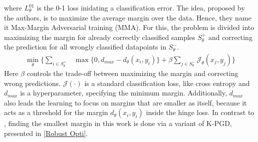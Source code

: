 \documentclass[conference]{IEEEtran}
\begin{document}
where $L_\theta^{01}$ is the 0-1 loss inidating a classification error. The idea, proposed by the authors, is to maximize the average margin over the data. Hence, they name it Max-Margin Adversarial training (MMA). For this, the problem is divided into maximizing the margin for already correctly classified samples $S_{\theta}^{+}$ and correcting the prediction for all wrongly classified datapoints in $S_{\theta}^{-}$.
\begin{align*}
  \min_{\theta} \Big\{ \sum_{i \in S_{\theta}^{+}} & \max \{0, d_{max} - d_\theta(x_i, y_i)\} + \beta \sum_{j \in S_{\theta}^{-}} \mathcal{J}_\theta (x_j, y_j) \Big\}
\end{align*}
Here $\beta$ controls the trade-off between maximizing the margin and correcting wrong predictions. $\mathcal{J}(\cdot)$ is a standard classification loss, like cross entropy and $d_{max}$ is a hyperparameter, specifying the minimum margin. Additionally, $d_{max}$ also leads the learning to focus on margins that are smaller as itself, because it acts as a threshold for the margin $d_\theta(x_i, y_i)$ inside the hinge loss. In contrast to \cite{b15}, finding the smallest margin in this work is done via a variant of K-PGD, presented in \ref{Robust Opti}.

\end{document}
